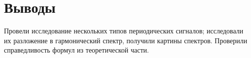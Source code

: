 \section{Выводы}

Провели исследование нескольких типов периодических сигналов; исследовали их разложение в гармонический спектр, получили картины спектров. Проверили справедливость формул из теоретической части.
